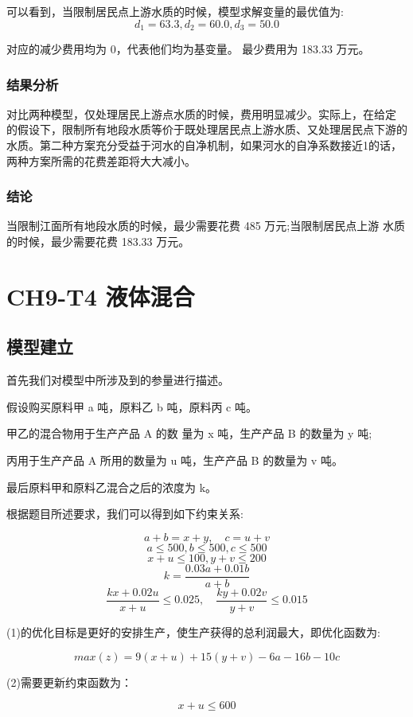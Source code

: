 \documentclass{article}
\begin{document}
可以看到，当限制居民点上游水质的时候，模型求解变量的最优值为:
$$d_1=63.3,d_2=60.0,d_3=50.0$$

对应的减少费用均为 0，代表他们均为基变量。
最少费用为 183.33 万元。

\subsubsection{结果分析}

对比两种模型，仅处理居民上游点水质的时候，费用明显减少。实际上，在给定 的假设下，限制所有地段水质等价于既处理居民点上游水质、又处理居民点下游的水质。第二种方案充分受益于河水的自净机制，如果河水的自净系数接近1的话，两种方案所需的花费差距将大大减小。

\subsubsection{结论}

当限制江面所有地段水质的时候，最少需要花费 485 万元;当限制居民点上游 水质的时候，最少需要花费 183.33 万元。


\section{CH9-T4 液体混合}

\subsection{模型建立}
首先我们对模型中所涉及到的参量进行描述。

假设购买原料甲 a 吨，原料乙 b 吨，原料丙 c 吨。

甲乙的混合物用于生产产品 A 的数 量为 x 吨，生产产品 B 的数量为 y 吨;

丙用于生产产品 A 所用的数量为 u 吨，生产产品 B 的数量为 v 吨。

最后原料甲和原料乙混合之后的浓度为 k。


根据题目所述要求，我们可以得到如下约束关系:

$$a+b=x+y,\quad c=u+v$$
$$a\leq 500,b\leq 500,c\leq500$$
$$x+u\leq100,y+v\leq200$$
$$k=\frac{0.03a+0.01b}{a+b}$$
$$\frac{kx+0.02u}{x+u}\leq0.025,\quad \frac{ky+0.02v}{y+v}\leq0.015$$

(1)的优化目标是更好的安排生产，使生产获得的总利润最大，即优化函数为:

$$max(z)=9(x+u)+15(y+v)-6a-16b-10c$$

(2)需要更新约束函数为：

$$x+u\leq600$$
\end{document}
